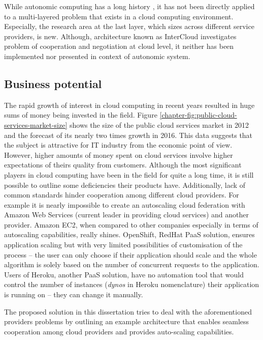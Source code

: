 While autonomic computing has a long history \cite{Mu04}, it has not been directly applied to a multi-layered problem that exists in a cloud computing environment. Especially, the research area at the last layer, which sizes across different service providers, is new. Although, architecture known as InterCloud \cite{BuRaCa10} investigates problem of cooperation and negotiation at cloud level, it neither has been implemented nor presented in context of autonomic system.

\subsection*{Business potential}
The rapid growth of interest in cloud computing in recent years resulted in huge sums of money being invested in the field. Figure \ref{chapter-fig:public-cloud-services-market-size} shows the size of the public cloud services market in 2012 and the forecast of its nearly two times growth in 2016. This data suggests that the subject is attractive for IT industry from the economic point of view. However, higher amounts of money spent on cloud services involve higher expectations of theirs quality from customers. Although the most significant players in cloud computing have been in the field for quite a long time, it is still possible to outline some deficiencies their products have. Additionally, lack of common standards hinder cooperation among different cloud providers. For example it is nearly impossible to create an autoscaling cloud federation with Amazon Web Services (current leader in providing cloud services\cite{GartnerMagicQuadrantSep2013}) and another provider. Amazon EC2, when compared to other companies especially in terms of autoscaling capabilities, really shines. OpenShift, RedHat PaaS solution, ensures application scaling but with very limited possibilities of customisation of the process -- the user can only choose if their application should scale and the whole algorithm is solely based on the number of concurrent requests to the application. Users of Heroku, another PaaS solution, have no automation tool that would control the number of instances (\emph{dynos} in Heroku nomenclature) their application is running on -- they can change it manually.

The proposed solution in this dissertation tries to deal with the aforementioned providers problems by outlining an example architecture that enables seamless cooperation among cloud providers and provides auto-scaling capabilities.

